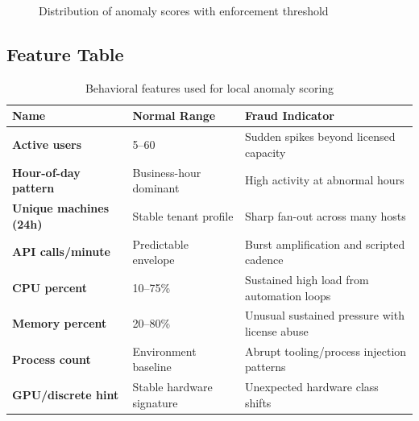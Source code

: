 \documentclass[11pt,a4paper]{article}
\begin{document}
\begin{figure}[H]
\centering
{}
\caption{Distribution of anomaly scores with enforcement threshold}
\end{figure}

\subsection{Feature Table}
\begin{table}[H]
\centering
\caption{Behavioral features used for local anomaly scoring}
\begin{tabularx}{\textwidth}{>{\bfseries}lYY}
\toprule
Name & Normal Range & Fraud Indicator \\
\midrule
Active users & 5--60 & Sudden spikes beyond licensed capacity \\
Hour-of-day pattern & Business-hour dominant & High activity at abnormal hours \\
Unique machines (24h) & Stable tenant profile & Sharp fan-out across many hosts \\
API calls/minute & Predictable envelope & Burst amplification and scripted cadence \\
CPU percent & 10--75\% & Sustained high load from automation loops \\
Memory percent & 20--80\% & Unusual sustained pressure with license abuse \\
Process count & Environment baseline & Abrupt tooling/process injection patterns \\
GPU/discrete hint & Stable hardware signature & Unexpected hardware class shifts \\
\bottomrule
\end{tabularx}
\end{table}
\end{document}
